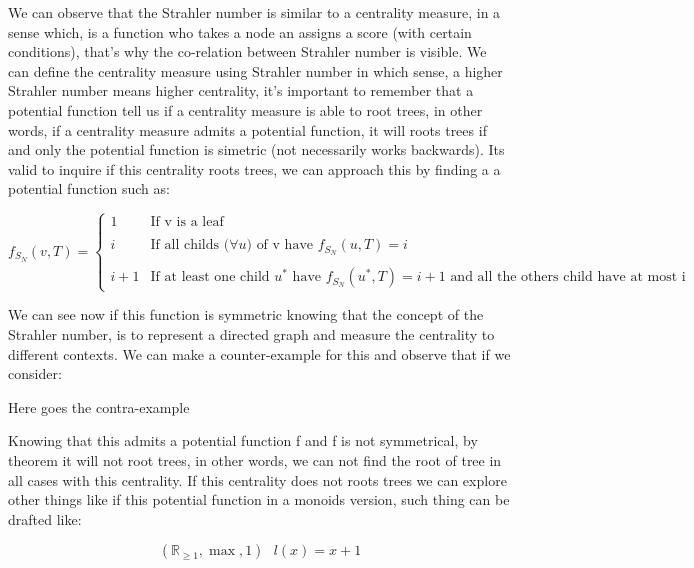 
We can observe that the Strahler number is similar to a centrality measure, in a sense which, is a function who takes a node an assigns a score (with certain conditions), that's why the co-relation between Strahler number is visible. We can define the centrality measure using Strahler number in which sense, a higher Strahler number means higher centrality, it's important to remember that a potential function tell us if a centrality measure is able to root trees, in other words, if a centrality measure admits a potential function, it will roots trees if and only the potential function is simetric (not necessarily works backwards). Its valid to inquire if this centrality roots trees, we can approach this by finding a a potential function such as:
\begin{center}
    \begin{equation}
        f_{S_{N}} (v,T) = \left\{ \begin{array}{lcc}
             1 &   \text{If v is a leaf}  &\\
             \\ i & \text{If all childs ($\forall u)$ of v have $f_{S_{N}} (u,T) = i$} \\
             \\ i + 1 &  \text{If at least one child $u^{
             *}$ have $f_{S_{N}} (u^{*},T) = i+1$  and all the others child  have at most i} 
             \end{array}
   \right.
    \end{equation}
\end{center}
We can see now if this function is symmetric knowing that the concept of the Strahler number, is to represent a directed graph and measure the centrality to different contexts. We can make a counter-example for this and observe that if we consider:

Here goes the contra-example
\begin{center}
    
\end{center}

Knowing that this admits a potential function f and f is not symmetrical, by theorem it will not root trees, in other words, we can not find the root of tree in all cases with this centrality. If this centrality does not roots trees we can explore other things like if this potential function in a monoids version, such thing can be drafted like:
\begin{center}
    \begin{equation}
        (\mathbb R_{\geq 1},\max,1)                \text{  $l(x) = x + 1$} 
    \end{equation}
\end{center}

